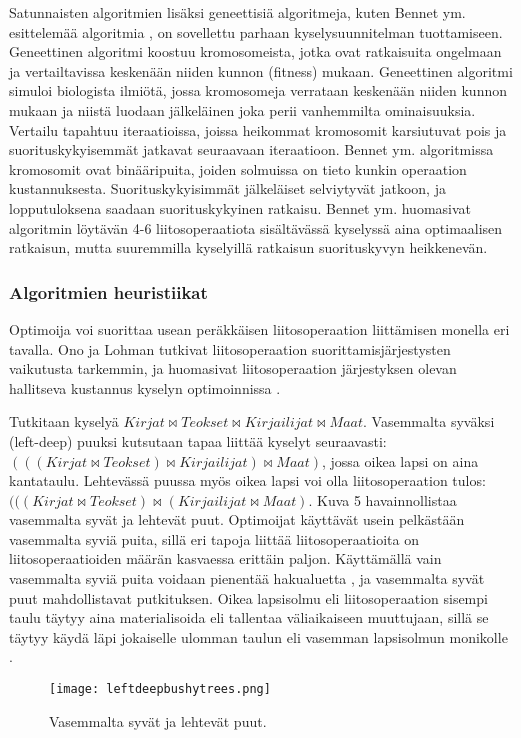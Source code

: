\documentclass[finnish]{tktltiki2}
\theoremstyle{definition}
\theoremstyle{remark}
\begin{document}
Satunnaisten algoritmien lisäksi geneettisiä algoritmeja, kuten Bennet ym. esittelemää algoritmia \cite{bennett1991genetic}, on sovellettu parhaan kyselysuunnitelman tuottamiseen. Geneettinen algoritmi koostuu kromosomeista, jotka ovat ratkaisuita ongelmaan ja vertailtavissa keskenään niiden kunnon (fitness) mukaan. Geneettinen algoritmi simuloi biologista ilmiötä, jossa kromosomeja verrataan keskenään niiden kunnon mukaan ja niistä luodaan jälkeläinen joka perii vanhemmilta ominaisuuksia. Vertailu tapahtuu iteraatioissa, joissa heikommat kromosomit karsiutuvat pois ja suorituskykyisemmät jatkavat seuraavaan iteraatioon. Bennet ym. algoritmissa kromosomit ovat binääripuita, joiden solmuissa on tieto kunkin operaation kustannuksesta. Suorituskykyisimmät jälkeläiset selviytyvät jatkoon, ja lopputuloksena saadaan suorituskykyinen ratkaisu. Bennet ym. huomasivat algoritmin löytävän 4-6 liitosoperaatiota sisältävässä kyselyssä aina optimaalisen ratkaisun, mutta suuremmilla kyselyillä ratkaisun suorituskyvyn heikkenevän.
\subsubsection{Algoritmien heuristiikat}
Optimoija voi suorittaa usean peräkkäisen liitosoperaation liittämisen monella eri tavalla. Ono ja Lohman tutkivat liitosoperaation suorittamisjärjestysten vaikutusta tarkemmin, ja huomasivat liitosoperaation järjestyksen olevan hallitseva kustannus kyselyn optimoinnissa \cite{ono1990}. 

Tutkitaan kyselyä $Kirjat \Join Teokset \Join Kirjailijat \Join Maat$. Vasemmalta syväksi (left-deep) puuksi kutsutaan tapaa liittää kyselyt seuraavasti: $(((Kirjat \Join Teokset) \Join Kirjailijat) \Join Maat)$, jossa oikea lapsi on aina kantataulu. Lehtevässä puussa myös oikea lapsi voi olla liitosoperaation tulos: $(((Kirjat \Join Teokset) \Join (Kirjailijat \Join Maat)$. Kuva 5 havainnollistaa vasemmalta syvät ja lehtevät puut. Optimoijat käyttävät usein pelkästään vasemmalta syviä puita, sillä eri tapoja liittää liitosoperaatioita on liitosoperaatioiden määrän kasvaessa erittäin paljon. Käyttämällä vain vasemmalta syviä puita voidaan pienentää hakualuetta \cite{ioannidis1991left}, ja vasemmalta syvät puut mahdollistavat putkituksen. Oikea lapsisolmu eli liitosoperaation sisempi taulu täytyy aina materialisoida eli tallentaa väliaikaiseen muuttujaan, sillä se täytyy käydä läpi jokaiselle ulomman taulun eli vasemman lapsisolmun monikolle \cite{ramakrishnan2003database}. 

\begin{figure}[!h]
  \centering
    \texttt{[image: leftdeepbushytrees.png]}
  \caption{Vasemmalta syvät ja lehtevät puut.}
\end{figure}
\end{document}
